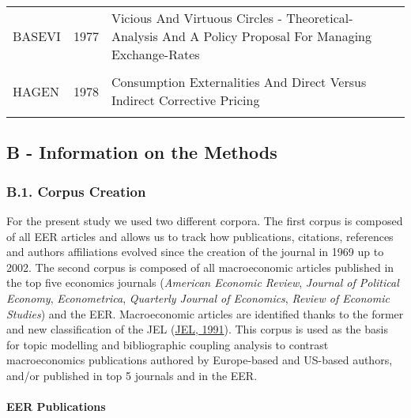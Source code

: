 \documentclass[
  12pt,
  onecolumn]{article}
\begin{document}
\begin{longtable}[t]{lc>{\raggedright\arraybackslash}m{40em}}
BASEVI & 1977 & Vicious And Virtuous Circles - Theoretical-Analysis And A Policy Proposal For Managing Exchange-Rates\\
\addlinespace
\cellcolor{gray!6}{MOERLAND} & \cellcolor{gray!6}{1978} & \cellcolor{gray!6}{Optimal Firm Behavior Under Different Fiscal Regimes}\\
HAGEN & 1978 & Consumption Externalities And Direct Versus Indirect Corrective Pricing\\
\cellcolor{gray!6}{OSTERRIETH} & \cellcolor{gray!6}{1978} & \cellcolor{gray!6}{Impact Of Less Developed-Countries Trading Position On World Agricultural Prices - Some Experiments With A Condensed Version Of Usda Grain-Oilseeds-Livestock Model}\\*
\end{longtable}
\endgroup{}

\newpage

\hypertarget{appendix}{%
\subsection*{B - Information on the Methods}\label{appendix}}

\hypertarget{corpus}{%
\subsubsection*{B.1. Corpus Creation}\label{corpus}}

For the present study we used two different corpora. The first corpus is composed of all EER articles and allows us to track how publications, citations, references and authors affiliations evolved since the creation of the journal in 1969 up to 2002. The second corpus is composed of all macroeconomic articles published in the top five economics journals (\emph{American Economic Review}, \emph{Journal of Political Economy}, \emph{Econometrica}, \emph{Quarterly Journal of Economics}, \emph{Review of Economic Studies}) and the EER. Macroeconomic articles are identified thanks to the former and new classification of the JEL (\protect\hyperlink{ref-jel1991}{JEL, 1991}). This corpus is used as the basis for topic modelling and bibliographic coupling analysis to contrast macroeconomics publications authored by Europe-based and US-based authors, and/or published in top 5 journals and in the EER.

\hypertarget{eer-publications}{%
\paragraph*{EER Publications}\label{eer-publications}}
\end{document}
